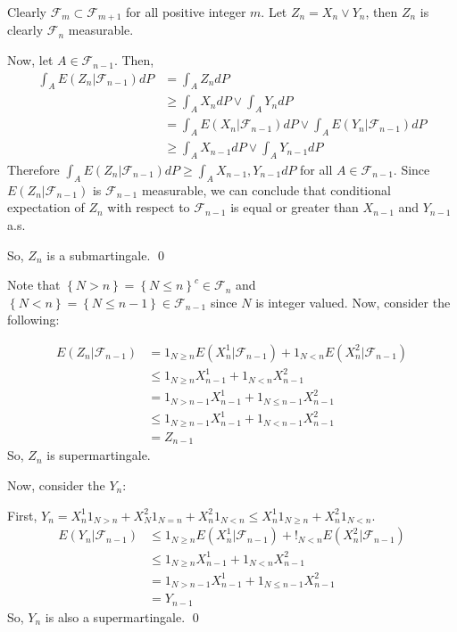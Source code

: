 \begin{problem}[4.2.3] \hfill

	Clearly $\mathcal{F}_m \subset \mathcal{F}_{m+1}$ for all positive integer $m$.
	Let $Z_n = X_n \vee Y_n$, then $Z_n$ is clearly $\mathcal{F}_n$ measurable.
	
	Now, let $A \in \mathcal{F}_{n-1}$. Then,
\[
	\begin{split}
		\int_A E(Z_n | \mathcal{F}_{n-1}) dP
		& = \int_A Z_n dP \\
		& \geq \int_A X_n dP \vee \int_A Y_n dP \\ 
		& = \int_A E(X_n | \mathcal{F}_{n-1})dP \vee \int_A E(Y_n | \mathcal{F}_{n-1}) dP \\
		& \geq \int_A X_{n-1} dP \vee \int_A Y_{n-1} dP
	\end{split}
\]
Therefore $\int_A E(Z_n | \mathcal{F}_{n-1}) dP \geq \int_A X_{n-1}, Y_{n-1} dP$ for all $A \in \mathcal{F}_{n-1}$.
Since $E(Z_n | \mathcal{F}_{n-1})$ is $\mathcal{F}_{n-1}$ measurable, we can conclude that conditional expectation of $Z_n$ with respect to $\mathcal{F}_{n-1}$ is equal or greater than $X_{n-1}$ and $Y_{n-1}$ a.s.

So, $Z_n$ is a submartingale.
\qed
\end{problem}

\begin{problem}[4.2.9] \hfill

	Note that $\left\{ N > n \right\} = \left\{ N \leq n \right\}^c \in \mathcal{F}_{n}$ and $\left\{ N<n \right\} = \left\{ N \leq n-1 \right\} \in \mathcal{F}_{n-1}$ since $N$ is integer valued. 
	Now, consider the following:

\[
	\begin{split}
		E(Z_n | \mathcal{F}_{n-1})
		& = 1_{N \geq n} E(X_n^1 | \mathcal{F}_{n-1}) + 1_{N < n} E(X_n^2 |\mathcal{F}_{n-1}) \\
		& \leq 1_{N \geq n} X_{n-1}^1 + 1_{N<n}X_{n-1}^2 \\
		& = 1_{N > n-1} X_{n-1}^1 + 1_{N \leq n-1} X_{n-1}^2 \\
		& \leq 1_{N \geq n-1} X_{n-1}^1 + 1_{N < n-1} X_{n-1}^2 \\
		& = Z_{n-1}
	\end{split}
\]
So, $Z_n$ is supermartingale.

	Now, consider the $Y_n$:
	
	First, $Y_n = X_n^1 1_{N>n} + X_N^2 1_{N=n} + X_n^2 1_{N<n} \leq X_n^1 1_{N\geq n} + X_n^2 1_{N <n}$.
\[
	\begin{split}
		E(Y_n |\mathcal{F}_{n-1})
		& \leq 1_{N\geq n} E\left( X_n^1 | \mathcal{F}_{n-1} \right) + !_{N<n}E\left( X_n^2 | \mathcal{F}_{n-1} \right) \\
		& \leq 1_{N \geq n} X_{n-1}^1 + 1_{N < n}X_{n-1}^2 \\
		& = 1_{N > n-1} X_{n-1}^1 + 1_{N \leq n-1}X_{n-1}^2 \\
		& = Y_{n-1}
	\end{split}
\]
So, $Y_n$ is also a supermartingale. \qed
\end{problem}
